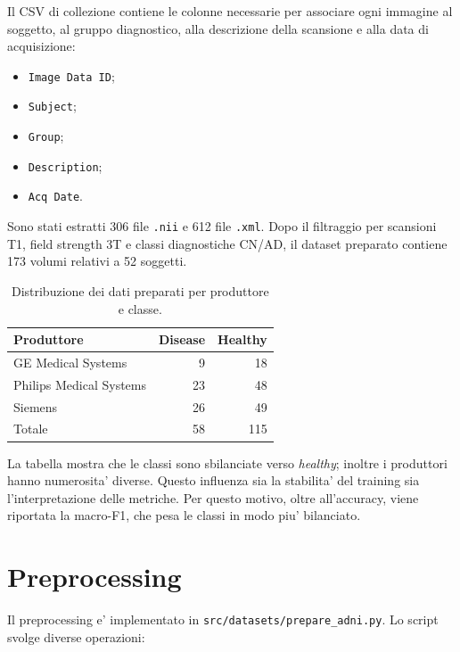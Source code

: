 \documentclass[12pt,a4paper]{article}
\begin{document}
Il CSV di collezione contiene le colonne necessarie per associare ogni immagine al soggetto, al gruppo diagnostico, alla descrizione della scansione e alla data di acquisizione:

\begin{itemize}[leftmargin=1.2cm]
    \item \texttt{Image Data ID};
    \item \texttt{Subject};
    \item \texttt{Group};
    \item \texttt{Description};
    \item \texttt{Acq Date}.
\end{itemize}

Sono stati estratti 306 file \texttt{.nii} e 612 file \texttt{.xml}. Dopo il filtraggio per scansioni T1, field strength 3T e classi diagnostiche CN/AD, il dataset preparato contiene 173 volumi relativi a 52 soggetti.

\begin{table}[H]
\centering
\caption{Distribuzione dei dati preparati per produttore e classe.}
\begin{tabular}{lrr}
\toprule
Produttore & Disease & Healthy \\
\midrule
GE Medical Systems & 9 & 18 \\
Philips Medical Systems & 23 & 48 \\
Siemens & 26 & 49 \\
\midrule
Totale & 58 & 115 \\
\bottomrule
\end{tabular}
\end{table}

La tabella mostra che le classi sono sbilanciate verso \emph{healthy}; inoltre i produttori hanno numerosita' diverse. Questo influenza sia la stabilita' del training sia l'interpretazione delle metriche. Per questo motivo, oltre all'accuracy, viene riportata la macro-F1, che pesa le classi in modo piu' bilanciato.

\section{Preprocessing}

Il preprocessing e' implementato in \texttt{src/datasets/prepare\_adni.py}. Lo script svolge diverse operazioni:
\end{document}
